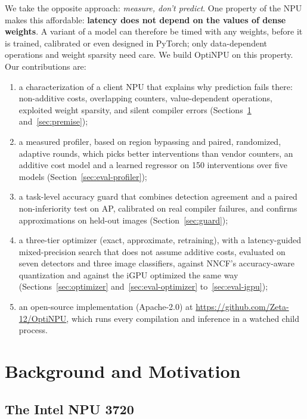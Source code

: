 \documentclass[conference]{IEEEtran}
\newcommand{\tool}{OptiNPU}
\begin{document}
We take the opposite approach: \emph{measure, don't predict}. One property of the NPU makes this affordable: \textbf{latency does not depend on the values of dense weights}. A variant of a model can therefore be timed with any weights, before it is trained, calibrated or even designed in PyTorch; only data-dependent operations and weight sparsity need care. We build \tool{} on this property. Our contributions are:
\begin{enumerate}
\item a characterization of a client NPU that explains why prediction fails there: non-additive costs, overlapping counters, value-dependent operations, exploited weight sparsity, and silent compiler errors (Sections~\ref{sec:motivation} and~\ref{sec:premise});
\item a measured profiler, based on region bypassing and paired, randomized, adaptive rounds, which picks better interventions than vendor counters, an additive cost model and a learned regressor on 150 interventions over five models (Section~\ref{sec:eval-profiler});
\item a task-level accuracy guard that combines detection agreement and a paired non-inferiority test on AP, calibrated on real compiler failures, and confirms approximations on held-out images (Section~\ref{sec:guard});
\item a three-tier optimizer (exact, approximate, retraining), with a latency-guided mixed-precision search that does not assume additive costs, evaluated on seven detectors and three image classifiers, against NNCF's accuracy-aware quantization and against the iGPU optimized the same way (Sections~\ref{sec:optimizer} and~\ref{sec:eval-optimizer} to~\ref{sec:eval-igpu});
\item an open-source implementation (Apache-2.0) at \url{https://github.com/Zeta-12/OptiNPU}, which runs every compilation and inference in a watched child process.
\end{enumerate}

\section{Background and Motivation}
\label{sec:motivation}

\subsection{The Intel NPU 3720}
\end{document}
